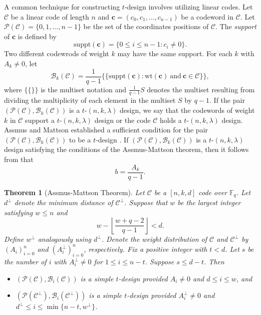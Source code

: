 \documentclass[sn-mathphys-num]{sn-jnl}%
\theoremstyle{thmstyleone}%
\newtheorem{theorem}{Theorem}%
\theoremstyle{thmstyletwo}%
\theoremstyle{thmstylethree}%
\begin{document}
A common technique for constructing $t$-design involves utilizing linear codes. Let $\mathcal{C}$ be a linear code of length $n$ and $\mathbf{c}=(c_{0},c_{1},\ldots,c_{n-1})$ be a codeword in $\mathcal{C}$. Let $\mathcal{P}(\mathcal{C})=\{0,1,\dots,n-1\}$ be the set of the coordinates positions of $\mathcal{C}$. The \textit{support} of $\mathbf{c}$ is defined by 
\begin{equation*}
	\mathrm{suppt}(\mathbf{c})=\{0\leq i\leq n-1:c_{i}\neq0\}.
\end{equation*}
Two different codewrods of weight $k$ may have the same support. For each $k$ with $A_k\ne 0$, let 
\begin{equation*}
	\mathcal{B}_k(\mathcal{C})=\frac{1}{q-1}\{\{\mathrm{suppt}(\mathbf{c}):\mathrm{wt}(\mathbf{c})\ \mathrm{and}\ \mathbf{c}\in\mathcal{C}\}\},
\end{equation*}
where $\{\{\}\}$ is the multiset notation and $\frac{1}{q-1}S$ denotes the multiset resulting from dividing the multiplicity of each element in the multiset $S$ by $q-1$. 
If the pair $(\mathcal{P}(\mathcal{C}),\mathcal{B}_k(\mathcal{C}))$ is a $t$-$(n,k,\lambda)$ design, we say that the codewords of weight $k$ in $\mathcal{C}$ support a $t$-$(n,k,\lambda)$ design or the code $\mathcal{C}$ holds a $t$-$(n,k,\lambda)$ design. Assmus and Mattson established a sufficient condition for the pair $(\mathcal{P}(\mathcal{C}),\mathcal{B}_k(\mathcal{C}))$ to be a $t$-design \cite[Theorem 4.2]{Assmus1969NewDesign}. If $(\mathcal{P}(\mathcal{C}),\mathcal{B}_k(\mathcal{C}))$ is a $t$-$(n,k,\lambda)$ design satisfying the conditions of the Assmus-Mattson theorem, then it follows from \cite[Lemma 4.25]{Ding2018DesignsLinearCodes} that
\begin{equation}\label{sec1.2 equ2}
	b=\frac{A_k}{q-1}.
\end{equation}

\begin{theorem}[Assmus-Mattson Theorem]
	\label{sec1 thm1}
	Let $\mathcal{C}$ be a $[n,k,d]$ code over $\mathbb{F}_q$. Let $d^\perp$ denote the minimum distance of $\mathcal{C}^\perp$. Suppose that $w$ be the largest integer satisfying $w\le n$ and 
	\begin{equation*}
		w-\left\lfloor\frac{w+q-2}{q-1}\right\rfloor<d.
	\end{equation*}
	Define $w^\perp$ analogously using $d^\perp$. Denote the weight distribution of $\mathcal{C}$ and $\mathcal{C}^\perp$ by $(A_i)_{i=0}^n$ and $(A^\perp_i)_{i=0}^n$, respectively. Fix a positive integer with $t<d$. Let $s$ be the number of $i$ with $A_i^\perp \ne 0$ for $1\le i \le n-t$. Suppose $s\le d-t$. Then
	\begin{itemize}
		\item $(\mathcal{P}(\mathcal{C}),\mathcal{B}_i(\mathcal{C}))$ is a simple $t$-design provided $A_i \ne 0$ and $ d \le i \le w$, and 
		\item $(\mathcal{P}(\mathcal{C}^\perp),\mathcal{B}_i(\mathcal{C}^\perp))$ is a simple $t$-design provided $A^\perp_i \ne 0$ and $ d^\perp \le i \le \min\{n-t,w^\perp\}$.
	\end{itemize}
\end{theorem}
\end{document}
